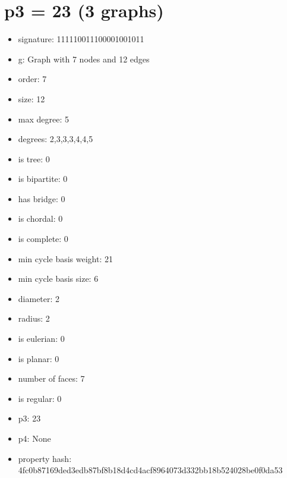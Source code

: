 \chapter{p3 = 23 (3 graphs)}
\newpage\begin{figure}
\end{figure}
\begin{itemize}
\item signature: 111110011100001001011
\item g: Graph with 7 nodes and 12 edges
\item order: 7
\item size: 12
\item max degree: 5
\item degrees: 2,3,3,3,4,4,5
\item is tree: 0
\item is bipartite: 0
\item has bridge: 0
\item is chordal: 0
\item is complete: 0
\item min cycle basis weight: 21
\item min cycle basis size: 6
\item diameter: 2
\item radius: 2
\item is eulerian: 0
\item is planar: 0
\item number of faces: 7
\item is regular: 0
\item p3: 23
\item p4: None
\item property hash: 4fc0b87169ded3edb87bf8b18d4cd4acf8964073d332bb18b524028be0f0da53
\end{itemize}
